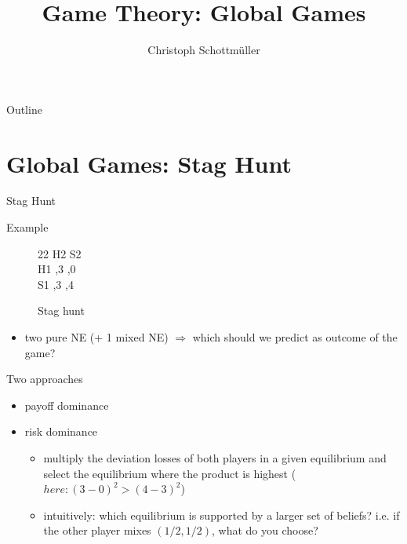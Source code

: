 \documentclass[bigger,allowframebreaks]{beamer}
\author{Christoph Schottmüller}
\date{}
\title{Game Theory: Global Games}
\begin{document}
\maketitle
\begin{frame}{Outline}
\tableofcontents
\end{frame}




\section{Global Games: Stag Hunt}
\label{sec-1}
\begin{frame}[label=sec-1-1]{Stag Hunt}
\begin{exampleblock}{Example}
  \begin{figure}[h]
    \centering
   \begin{game}{2}{2}
          \>  H2 \> S2\\
     H1   ,3 ,0\\
    S1   ,3 ,4
   \end{game}
  \caption{Stag hunt}
\end{figure}

\begin{itemize}
\item two pure NE (+ 1 mixed NE) $\Rightarrow$ which should we predict as outcome of the game?
\end{itemize}
\end{exampleblock}
\end{frame}

\begin{frame}[label=sec-1-2]{Two approaches}
\begin{itemize}
\item payoff dominance
\item risk dominance
\begin{itemize}
\item multiply the deviation losses of both players in a given equilibrium and select the equilibrium where the product is highest ($here: (3-0)^2>(4-3)^2$)
\item intuitively: which equilibrium is supported by a larger set of beliefs? i.e. if the other player mixes $(1/2,1/2)$, what do you choose?
\end{itemize}
\end{itemize}
\end{frame}
\end{document}

